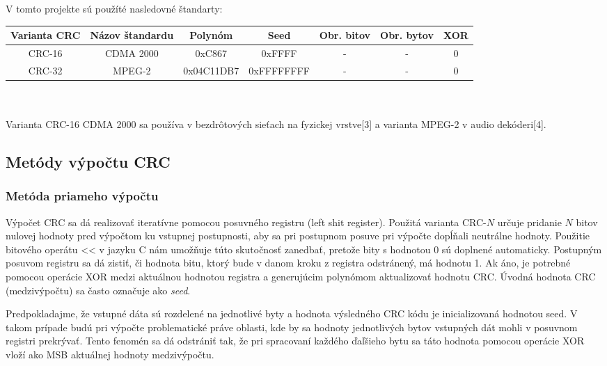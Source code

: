 \documentclass[11pt,a4paper]{article}
\begin{document}
\noindent V tomto projekte sú použíté nasledovné štandarty:\\

\begin{tabular}{|c|c|c|c|c|c|c|}
\hline
Varianta CRC & Názov štandardu & Polynóm & Seed & Obr. bitov & Obr. bytov & XOR \\ \hline
CRC-16 & CDMA 2000 & 0xC867     & 0xFFFF     & - & - & 0 \\ \hline
CRC-32 & MPEG-2    & 0x04C11DB7 & 0xFFFFFFFF & - & - & 0 \\ \hline
\end{tabular} \\ \\

\noindent Varianta CRC-16 CDMA 2000 sa používa v bezdrôtových sieťach na fyzickej vrstve[3] a varianta MPEG-2 v audio dekóderi[4].

\subsection{Metódy výpočtu CRC}

\subsubsection{Metóda priameho výpočtu}

Výpočet CRC sa dá realizovať iteratívne pomocou posuvného registru (left shit register).
Použitá varianta CRC-$N$ určuje pridanie $N$ bitov nulovej hodnoty pred výpočtom ku vstupnej postupnosti, aby sa pri postupnom posuve pri výpočte dopĺňali neutrálne hodnoty. Použitie bitového operátu << v jazyku C nám umožňuje túto skutočnosť zanedbať, pretože bity s hodnotou 0 sú doplnené automaticky. Postupným posuvom registru sa dá zistiť, či hodnota bitu, ktorý bude v danom kroku z registra odstránený, má hodnotu 1. Ak áno, je potrebné pomocou operácie XOR medzi aktuálnou hodnotou registra a generujúcim polynómom aktualizovať hodnotu CRC. Úvodná hodnota CRC (medzivýpočtu) sa často označuje ako \textit{seed}.

Predpokladajme, že vstupné dáta sú rozdelené na jednotlivé byty a hodnota výsledného CRC kódu je inicializovaná hodnotou seed. V takom prípade budú pri výpočte problematické práve oblasti, kde by sa hodnoty jednotlivých bytov vstupných dát mohli v posuvnom registri prekrývať. Tento fenomén sa dá odstrániť tak, že pri spracovaní každého ďaľšieho bytu sa táto hodnota pomocou operácie XOR vloží ako MSB aktuálnej hodnoty medzivýpočtu.\\
\end{document}
